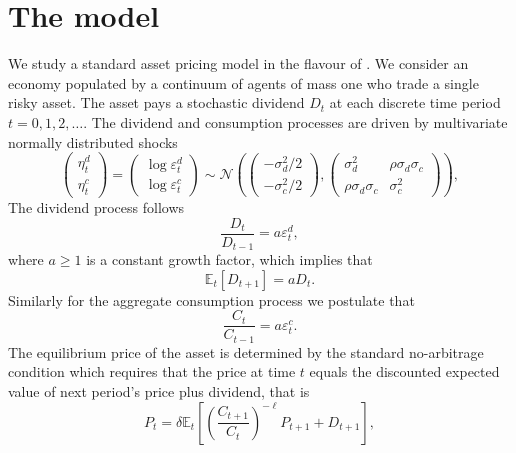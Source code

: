 \documentclass[11pt]{article}
\begin{document}
\section{The model}\label{sec:model}


We study a standard \cite{Lucas1978} asset pricing model in the flavour of \cite{Adam2016}.
We consider an economy populated by a continuum of agents of mass one who trade a single risky asset.
The asset pays a stochastic dividend $D_t$ at each discrete time period $t = 0,1,2,\ldots$.
The dividend and consumption processes are driven by multivariate normally distributed shocks
\begin{equation}
    \begin{pmatrix}
    \eta^d_t \\
    \eta^c_t
    \end{pmatrix} 
    =
    \begin{pmatrix}
    \log \varepsilon^d_t \\
    \log \varepsilon^c_t
    \end{pmatrix} \sim \mathcal{N}\left(\begin{pmatrix}
    -\sigma^2_d/2 \\
    -\sigma^2_c/2
    \end{pmatrix}, \begin{pmatrix}
    \sigma^2_d & \rho \sigma_d \sigma_c \\
    \rho \sigma_d \sigma_c & \sigma^2_c
    \end{pmatrix}\right),
\end{equation}
The dividend process follows 
\begin{equation}
    \frac{D_t}{D_{t-1}} = a \varepsilon^d_t,
\end{equation}
where $a \geq 1$ is a constant growth factor, which implies that
\begin{equation}
    \mathbb{E}_t\left[{D_{t+1}}\right] = a D_t.
\end{equation}
Similarly for the aggregate consumption process we postulate that
\begin{equation}
    \frac{C_t}{C_{t-1}} = a \varepsilon^c_t.
\end{equation}
The equilibrium price of the asset is determined by the standard no-arbitrage condition which requires that the price at time $t$ equals the discounted expected value of next period's price plus dividend, that is
\begin{equation}\label{eq:equilibrium_price}
    P_t = \delta \mathbb{E}_t \left[{ \left(\frac{C_{t+1}}{C_t}\right)^{- \ell} P_{t+1} + D_{t+1}}\right],
\end{equation}
\end{document}
